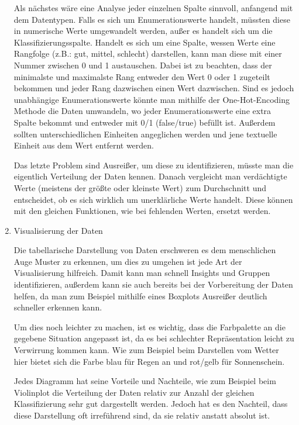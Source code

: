\begin{enumerate}
            Als nächstes wäre eine Analyse jeder einzelnen Spalte sinnvoll, anfangend mit dem Datentypen. Falls es sich um Enumerationswerte handelt, müssten diese in numerische Werte umgewandelt werden, außer es handelt sich um die Klassifizierungsspalte. Handelt es sich um eine Spalte, wessen Werte eine Rangfolge  (z.B.: gut, mittel, schlecht) darstellen, kann man diese mit einer Nummer zwischen 0 und 1 austauschen. Dabei ist zu beachten, dass der minimalste und maximalste Rang entweder den Wert 0 oder 1 zugeteilt bekommen und jeder Rang dazwischen einen Wert dazwischen. Sind es jedoch unabhängige Enumerationswerte könnte man mithilfe der One-Hot-Encoding Methode die Daten umwandeln, wo jeder Enumerationswerte eine extra Spalte bekommt und entweder mit 0/1 (false/true) befüllt ist. Außerdem sollten unterschiedlichen Einheiten angeglichen werden und jene textuelle Einheit aus dem Wert entfernt werden.

            Das letzte Problem sind Ausreißer, um diese zu identifizieren, müsste man die eigentlich Verteilung der Daten kennen. Danach vergleicht man verdächtigte Werte (meistens der größte oder kleinste Wert) zum Durchschnitt und entscheidet, ob es sich wirklich um unerklärliche Werte handelt. Diese können mit den gleichen Funktionen, wie bei fehlenden Werten, ersetzt werden.

      \item Visualisierung der Daten

            Die tabellarische Darstellung von Daten erschweren es dem menschlichen Auge Muster zu erkennen, um dies zu umgehen ist jede Art der Visualisierung hilfreich. Damit kann man schnell Insights und Gruppen identifizieren, außerdem kann sie auch bereits bei der Vorbereitung der Daten helfen, da man zum Beispiel mithilfe eines Boxplots Ausreißer deutlich schneller erkennen kann.

            Um dies noch leichter zu machen, ist es wichtig, dass die Farbpalette an die gegebene Situation angepasst ist, da es bei schlechter Repräsentation leicht zu Verwirrung kommen kann. Wie zum Beispiel beim Darstellen vom Wetter hier bietet sich die Farbe blau für Regen an und rot/gelb für Sonnenschein.

            Jedes Diagramm hat seine Vorteile und Nachteile, wie zum Beispiel beim Violinplot die Verteilung der Daten relativ zur Anzahl der gleichen Klassifizierung sehr gut dargestellt werden. Jedoch hat es den Nachteil, dass diese Darstellung oft irreführend sind, da sie relativ anstatt absolut ist.


\end{enumerate}
